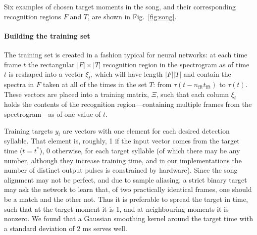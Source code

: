 \documentclass[10pt,letterpaper]{article}
\newcommand\fig[1]{Fig.~\ref{#1}}
\let\oldmarginpar\marginpar
\renewcommand{\marginpar}[1]{\oldmarginpar{\linespread{1}\scriptsize{#1}}}
\renewcommand{\subsubsection}[1]{\paragraph{#1}}
\begin{document}
Six examples of chosen target moments in the song, and their
corresponding recognition regions $F$ and $T$, are shown in
\fig{fig:song}.




\subsubsection{Building the training set}

The training set is created in a fashion typical for neural networks:
at each time frame $t$ the rectangular $|F|\times |T|$ recognition
region in the spectrogram as of time $t$ is reshaped into a vector
$\xi_t$, which will have length $|F||T|$ and contain the spectra in
$F$ taken at all of the times in the set $T$: from
$\tau(t-n_\textrm{fft}t_\textrm{fft})$ to $\tau(t)$.  These vectors
are placed into a training matrix, $\Xi$, such that each column
$\xi_t$ holds the contents of the recognition region---containing
multiple frames from the spectrogram---as of one value of $t$.

Training targets $y_t$ are vectors with one element for each desired
detection syllable.  That element is, roughly, 1 if the input vector
comes from the target time ($t=t^*$), 0 otherwise, for each target
syllable (of which there may be any number, although they increase
training time, and in our implementations the number of distinct
output pulses is constrained by hardware).  Since the song alignment
may not be perfect, and due to sample aliasing, a
strict binary target may ask the network to learn that, of two
practically identical frames, one should be a match and the other
not. Thus it is preferable to spread the target in time, such that at
the target moment it is 1, and at neighbouring moments it is
nonzero. We found that a Gaussian smoothing kernel around the target
time with a standard deviation of 2 ms serves well.
\end{document}
